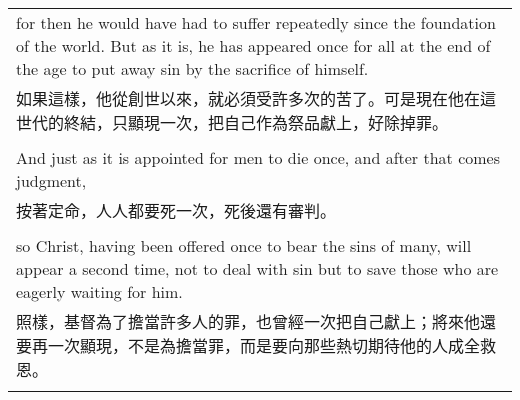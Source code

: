 \begin{tabularx}{\textwidth}{p{}}
for then he would have had to suffer repeatedly since the foundation of the world. But as it is, he has appeared once for all at the end of the age to put away sin by the sacrifice of himself. \\
如果這樣，他從創世以來，就必須受許多次的苦了。可是現在他在這世代的終結，只顯現一次，把自己作為祭品獻上，好除掉罪。 \\ \\
And just as it is appointed for men to die once, and after that comes judgment, \\
按著定命，人人都要死一次，死後還有審判。 \\ \\
so Christ, having been offered once to bear the sins of many, will appear a second time, not to deal with sin but to save those who are eagerly waiting for him. \\
照樣，基督為了擔當許多人的罪，也曾經一次把自己獻上；將來他還要再一次顯現，不是為擔當罪，而是要向那些熱切期待他的人成全救恩。 \\ \\

\hline
\end{tabularx}

\newpage

